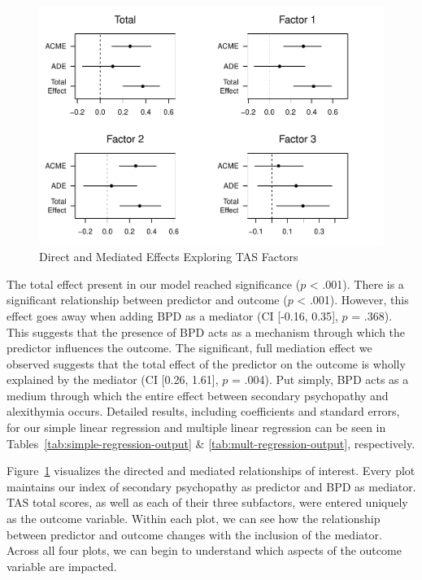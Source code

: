 \documentclass[
  man,floatsintext]{apa7}
\begin{document}
\begin{figure}
\includegraphics[width=1\linewidth]{d2m-Psychopathy_files/figure-latex/mediation-plot-1} \caption{Direct and Mediated Effects Exploring TAS Factors}\label{fig:mediation-plot}
\end{figure}

The total effect present in our model reached significance (\(p\) \textless{} .001). There is a significant relationship between predictor and outcome (\(p\) \textless{} .001). However, this effect goes away when adding BPD as a mediator (CI {[}-0.16, 0.35{]}, \(p\) = .368). This suggests that the presence of BPD acts as a mechanism through which the predictor influences the outcome. The significant, full mediation effect we observed suggests that the total effect of the predictor on the outcome is wholly explained by the mediator (CI {[}0.26, 1.61{]}, \(p\) = .004). Put simply, BPD acts as a medium through which the entire effect between secondary psychopathy and alexithymia occurs. Detailed results, including coefficients and standard errors, for our simple linear regression and multiple linear regression can be seen in Tables~\ref{tab:simple-regression-output} \& \ref{tab:mult-regression-output}, respectively.

Figure~\ref{fig:mediation-plot} visualizes the directed and mediated relationships of interest. Every plot maintains our index of secondary psychopathy as predictor and BPD as mediator. TAS total scores, as well as each of their three subfactors, were entered uniquely as the outcome variable. Within each plot, we can see how the relationship between predictor and outcome changes with the inclusion of the mediator. Across all four plots, we can begin to understand which aspects of the outcome variable are impacted.
\end{document}
